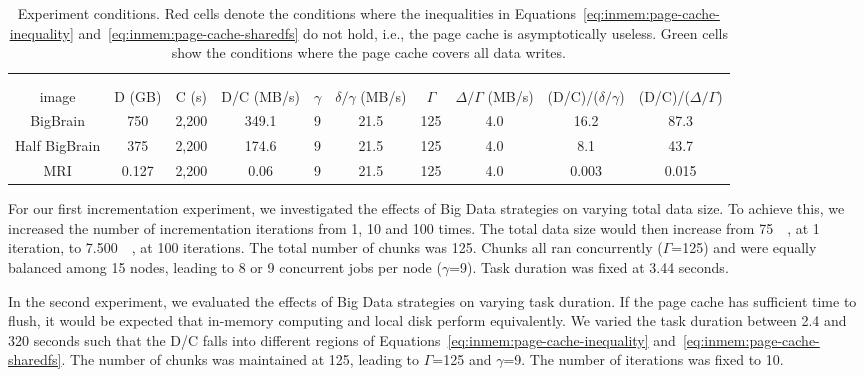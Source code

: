 \begin{table}
{\begin{tabular}{c|ccc|cccc|cc}
\hline
  \multicolumn{10}{c}{}\\ 
 \rowcolor{headcolor}
  \multicolumn{10}{c}{Experiment 4: Image Size}\\
  \hline
  \rowcolor{headcolor}
 image  & D (GB) & C (s) & D/C (MB/s) & $\gamma$ & $\delta/\gamma$ (MB/s) &
 $\Gamma$ & $\Delta/\Gamma$ (MB/s)& (D/C)/($\delta/\gamma$) &
 (D/C)/($\Delta/\Gamma$)\\
 \hline
 BigBrain      & 750   & 2,200   & 349.1     & 9  & 21.5  & 125 & 4.0 &
 \cellcolor{red!20} 16.2 & \cellcolor{red!20} 87.3   \\
 Half BigBrain & 375   & 2,200   & 174.6     & 9  & 21.5  & 125 & 4.0 &
 \cellcolor{red!20} 8.1 & \cellcolor{red!20} 43.7   \\
 MRI           & 0.127 & 2,200   & 0.06      & 9  & 21.5  & 125 & 4.0 &
 \cellcolor{green!20} 0.003 & \cellcolor{green!20} 0.015  
\end{tabular}
} \caption{Experiment conditions. Red cells denote the conditions where the
inequalities in Equations~\ref{eq:inmem:page-cache-inequality}
and~\ref{eq:inmem:page-cache-sharedfs} do not hold, i.e., the page cache is
asymptotically useless. Green cells show the conditions where the page cache
covers all data writes.}
\label{table:inmem:experiments}
\end{table}

For our first incrementation experiment, we investigated the effects of Big Data
strategies on varying total data size. To achieve this, we increased the number
of incrementation iterations from 1, 10 and 100 times. The total data size would
then increase from \SI{75}{\giga\byte}, at 1 iteration, to \SI{7,500}{\giga\byte}, at 100 iterations. The
total number of chunks was 125. Chunks all ran concurrently ($\Gamma$=125) and
were equally balanced among 15 nodes, leading to 8 or 9 concurrent jobs per node
($\gamma$=9). Task duration was fixed at 3.44 seconds.

In the second experiment, we evaluated the effects of Big Data strategies on
varying task duration. If the page cache has sufficient time to flush, it would
be expected that in-memory computing and local disk perform equivalently. We
varied the task duration between 2.4 and 320 seconds such that the D/C falls
into different regions of Equations~\ref{eq:inmem:page-cache-inequality}
and~\ref{eq:inmem:page-cache-sharedfs}. The number of chunks was maintained at 125,
leading to $\Gamma$=125 and $\gamma$=9. The number of iterations was fixed to
10.

